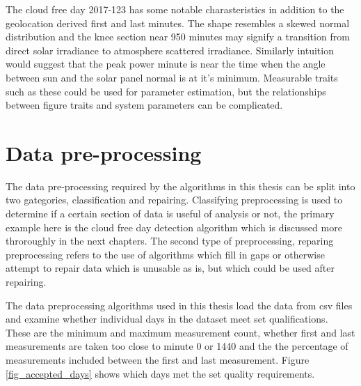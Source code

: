 The cloud free day 2017-123 has some notable charasteristics in addition to the geolocation derived first and last minutes. The shape resembles a skewed normal distribution and the knee section near 950 minutes may signify a transition from direct solar irradiance to atmosphere scattered irradiance. Similarly intuition would suggest that the peak power minute is near the time when the angle between sun and the solar panel normal is at it's minimum. Measurable traits such as these could be used for parameter estimation, but the relationships between figure traits and system parameters can be complicated.



\newpage
\section{Data pre-processing}
The data pre-processing required by the algorithms in this thesis can be split into two gategories, classification and repairing. Classifying preprocessing is used to determine if a certain section of data is useful of analysis or not, the primary example here is the cloud free day detection algorithm which is discussed more throroughly in the next chapters. The second type of preprocessing, reparing preprocessing refers to the use of algorithms which fill in gaps or otherwise attempt to repair data which is unusable as is, but which could be used after repairing.



The data preprocessing algorithms used in this thesis load the data from csv files and examine whether individual days in the dataset meet set qualifications. These are the minimum and maximum measurement count, whether first and last measurements are taken too close to minute 0 or 1440 and the the percentage of measurements included between the first and last measurement. Figure \ref{fig_accepted_days} shows which days met the set quality requirements.



